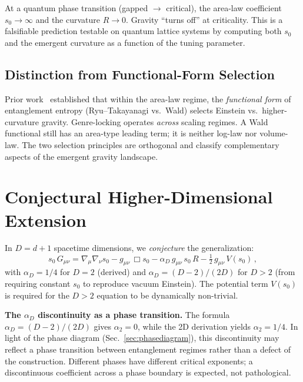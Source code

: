 \documentclass[aps,prd,twocolumn,superscriptaddress,nofootinbib,floatfix]{revtex4-2}
\newcommand{\sn}{s_0}
\newcommand{\aD}{\alpha_D}
\newcommand{\dAlem}{\Box}
\begin{document}
At a quantum phase transition (gapped $\to$ critical), the area-law coefficient $\sn \to \infty$ and the curvature $R \to 0$. Gravity ``turns off'' at criticality. This is a falsifiable prediction testable on quantum lattice systems by computing both $\sn$ and the emergent curvature as a function of the tuning parameter.

\subsection{Distinction from Functional-Form Selection}

Prior work~\cite{Faulkner2014,Swingle2014,Haehl2018} established that within the area-law regime, the \emph{functional form} of entanglement entropy (Ryu--Takayanagi vs.\ Wald) selects Einstein vs.\ higher-curvature gravity. Genre-locking operates \emph{across} scaling regimes. A Wald functional still has an area-type leading term; it is neither log-law nor volume-law. The two selection principles are orthogonal and classify complementary aspects of the emergent gravity landscape.

\section{Conjectural Higher-Dimensional Extension}
\label{sec:higherD}

In $D = d{+}1$ spacetime dimensions, we \emph{conjecture} the generalization:
\begin{equation}
\label{eq:higherD}
\sn\,G_{\mu\nu} = \nabla_\mu\nabla_\nu\sn - g_{\mu\nu}\,\dAlem\sn - \aD\,g_{\mu\nu}\,\sn\,R - \tfrac{1}{2}\,g_{\mu\nu}\,V(\sn)\,,
\end{equation}
with $\aD = 1/4$ for $D = 2$ (derived) and $\aD = (D{-}2)/(2D)$ for $D > 2$ (from requiring constant $\sn$ to reproduce vacuum Einstein). The potential term $V(\sn)$ is required for the $D > 2$ equation to be dynamically non-trivial.

\textbf{The $\alpha_D$ discontinuity as a phase transition.} The formula $\aD = (D{-}2)/(2D)$ gives $\alpha_2 = 0$, while the 2D derivation yields $\alpha_2 = 1/4$. In light of the phase diagram (Sec.~\ref{sec:phasediagram}), this discontinuity may reflect a phase transition between entanglement regimes rather than a defect of the construction. Different phases have different critical exponents; a discontinuous coefficient across a phase boundary is expected, not pathological.
\end{document}
